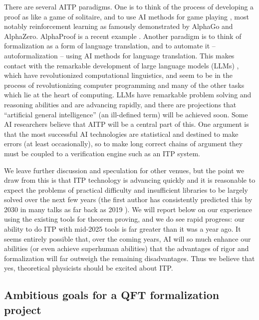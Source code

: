 \documentclass{article}
\begin{document}
There are several AITP paradigms.  One is to think of the process of developing a proof as like a game of solitaire, and to use AI methods for game playing \cite{}, most notably reinforcement learning as famously demonstrated by AlphaGo and AlphaZero.  AlphaProof is a recent example \cite{}.
Another paradigm is to think of formalization as a form of language translation, and to automate it -- autoformalization \cite{} -- using AI methods for language translation.  This makes contact with the remarkable development of large language models (LLMs) \cite{}, which have revolutionized computational linguistics, and seem to be in the process of revolutionizing computer programming and many of the other tasks which lie at the heart of computing.  LLMs have remarkable problem solving and reasoning abilities and are advancing rapidly, and there are projections that ``artificial general intelligence'' (an ill-defined term) will be achieved soon.  Some AI researchers believe that AITP will be a central part of this.  One argument is that the most successful AI technologies are statistical and destined to make errors (at least occasionally), so to make long correct chains of argument they must be coupled to a verification engine such as an ITP system.

We leave further discussion and speculation for other venues, but the point we draw from this is that ITP technology is advancing quickly and it is reasonable to expect the problems of practical difficulty and insufficient libraries to be largely solved over the next few years (the first author has consistently predicted this by 2030 in many talks as far back as 2019 \cite{}).  We will report below on our experience using the existing tools for theorem proving, and we do see rapid progress: our ability to do ITP with mid-2025 tools is far greater than it was a year ago.
It seems entirely possible that, over the coming years, AI will so much enhance our abilities (or even achieve superhuman abilities) that the advantages of rigor and formalization will far outweigh the remaining disadvantages.  Thus we believe that yes, theoretical physicists should be excited about ITP.

\subsection{Ambitious goals for a QFT formalization project}
\end{document}
